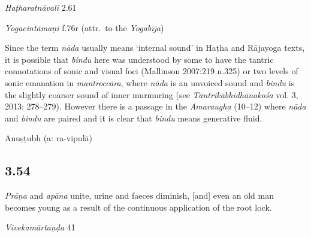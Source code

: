 \begin{ekdosis}
\begin{testimonia}[hp03_053]
\emph{Haṭharatnāvalī} 2.61
\begin{versinnote}
\end{versinnote}

\emph{Yogacintāmaṇi} f.76r (attr.~to the \emph{Yogabīja})
\begin{versinnote}
\end{versinnote}

\end{testimonia}

\begin{philcomm}[hp03_053]
Since the term \emph{nāda} usually means `internal sound' in Haṭha and Rājayoga texts, it is possible that \emph{bindu} here was understood by some to have the tantric connotations of sonic and visual foci (Mallinson 2007:219 n.325) or two levels of sonic emanation in \emph{mantroccāra}, where \emph{nāda} is an unvoiced sound and \emph{bindu} is the slightly coarser sound of inner murmuring (see \emph{Tāntrikābhidhānakośa} vol. 3, 2013: 278–279). However there is a passage in the \emph{Amaraugha} (10–12) where \emph{nāda} and \emph{bindu} are paired and it is clear that \emph{bindu} means generative fluid. 
\end{philcomm}


\begin{metre}[hp03_053]
Anuṣṭubh (a: ra-vipulā)
\end{metre}

\subsection*{3.54}
\begin{translation}[hp03_054]
\textit{Prāṇa} and \textit{apāna} unite, urine and faeces diminish, [and] even an old man becomes young as a result of the continuous application of the root lock.
\end{translation}

\begin{sources}[hp03_054]
\emph{Vivekamārtaṇḍa} 41
\begin{versinnote}
\end{versinnote}


\end{sources}
\end{ekdosis}
